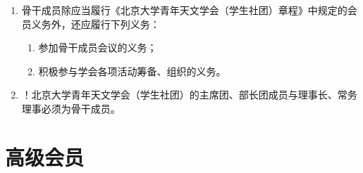 \begin{enumerate}[resume]
    \item 骨干成员除应当履行《北京大学青年天文学会（学生社团）章程》中规定的会员义务外，还应履行下列义务：
    \begin{enumerate}
        \item 参加骨干成员会议的义务；
        \item 积极参与学会各项活动筹备、组织的义务。
    \end{enumerate}
    
    \item ！北京大学青年天文学会（学生社团）的主席团、部长团成员与理事长、常务理事必须为骨干成员。
\end{enumerate}

\section{高级会员}

